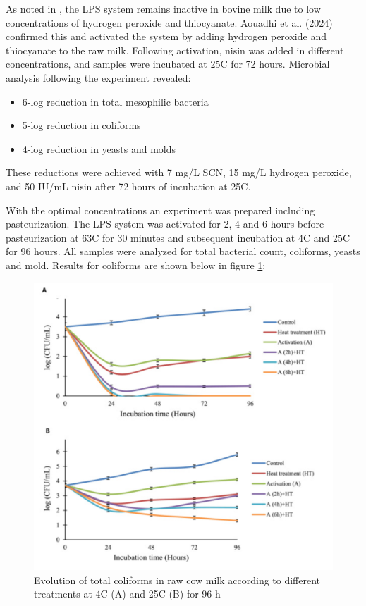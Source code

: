 \vline

As noted in \cite*{RM_01}, the LPS system remains inactive in bovine milk due to low concentrations of hydrogen peroxide and thiocyanate. Aouadhi et al. (2024) confirmed this and activated the system by adding hydrogen peroxide and thiocyanate to the raw milk. Following activation, nisin was added in different concentrations, and samples were incubated at 25\textdegree C for 72 hours. Microbial analysis following the experiment revealed:
\begin{itemize}
    \item 6-log reduction in total mesophilic bacteria
    \item 5-log reduction in coliforms
    \item 4-log reduction in yeasts and molds
\end{itemize}


These reductions were achieved with 7 mg/L SCN, 15 mg/L hydrogen peroxide, and 50 IU/mL nisin after 72 hours of incubation at 25\textdegree C. 

\vline 

With the optimal concentrations an experiment was prepared including pasteurization. The LPS system was activated for 2, 4 and 6 hours before pasteurization at 63\textdegree C for 30 minutes and subsequent incubation at 4\textdegree C and 25\textdegree C for 96 hours. All samples were analyzed for total bacterial count, coliforms, yeasts and mold. Results for coliforms are shown below in figure \ref*{fig_02}:

\begin{figure}[h]
    \center
    \includegraphics[width=0.8\linewidth]{Figures/fig_01.png}
    \caption{Evolution of total coliforms in raw cow milk according to different treatments at 4\textdegree C (A) and 25\textdegree C (B) for 96 h \cite{RM_02}}
    \label{fig_02}
\end{figure}

